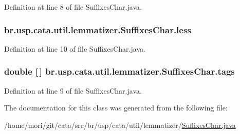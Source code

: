 Definition at line 8 of file Suffixes\+Char.\+java.

\hypertarget{classbr_1_1usp_1_1cata_1_1util_1_1lemmatizer_1_1_suffixes_char_a99cfb426c538f5fc4c4f152b224853a1}{
\subsubsection[{less}]{ br.\+usp.\+cata.\+util.\+lemmatizer.\+Suffixes\+Char.\+less\hspace{0.3cm}{\ttfamily [private]}}}\label{classbr_1_1usp_1_1cata_1_1util_1_1lemmatizer_1_1_suffixes_char_a99cfb426c538f5fc4c4f152b224853a1}


Definition at line 10 of file Suffixes\+Char.\+java.

\hypertarget{classbr_1_1usp_1_1cata_1_1util_1_1lemmatizer_1_1_suffixes_char_a3a403a4cc19ce7a9c5d0c279b7a06632}{
\subsubsection[{tags}]{\setlength{\rightskip}{0pt plus 5cm}double \mbox{[}$\,$\mbox{]} br.\+usp.\+cata.\+util.\+lemmatizer.\+Suffixes\+Char.\+tags\hspace{0.3cm}{\ttfamily [private]}}}\label{classbr_1_1usp_1_1cata_1_1util_1_1lemmatizer_1_1_suffixes_char_a3a403a4cc19ce7a9c5d0c279b7a06632}


Definition at line 9 of file Suffixes\+Char.\+java.



The documentation for this class was generated from the following file\+:\begin{DoxyCompactItemize}
\item 
/home/mori/git/cata/src/br/usp/cata/util/lemmatizer/\hyperlink{_suffixes_char_8java}{Suffixes\+Char.\+java}\end{DoxyCompactItemize}
